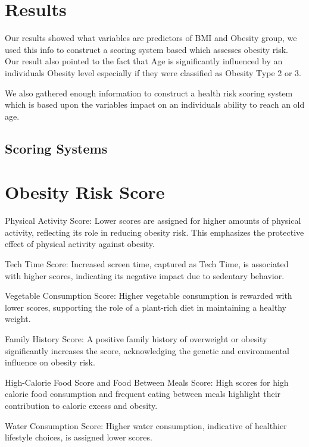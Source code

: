 \documentclass[
]{article}
\begin{document}
\hypertarget{results}{%
\section{Results}\label{results}}

Our results showed what variables are predictors of BMI and Obesity
group, we used this info to construct a scoring system based which
assesses obesity risk. Our result also pointed to the fact that Age is
significantly influenced by an individuals Obesity level especially if
they were classified as Obesity Type 2 or 3.

We also gathered enough information to construct a health risk scoring
system which is based upon the variables impact on an individuals
ability to reach an old age.

\hypertarget{scoring-systems}{%
\subsection{Scoring Systems}\label{scoring-systems}}

\hypertarget{obesity-risk-score}{%
\section{Obesity Risk Score}\label{obesity-risk-score}}

Physical Activity Score: Lower scores are assigned for higher amounts of
physical activity, reflecting its role in reducing obesity risk. This
emphasizes the protective effect of physical activity against obesity.

Tech Time Score: Increased screen time, captured as Tech Time, is
associated with higher scores, indicating its negative impact due to
sedentary behavior.

Vegetable Consumption Score: Higher vegetable consumption is rewarded
with lower scores, supporting the role of a plant-rich diet in
maintaining a healthy weight.

Family History Score: A positive family history of overweight or obesity
significantly increases the score, acknowledging the genetic and
environmental influence on obesity risk.

High-Calorie Food Score and Food Between Meals Score: High scores for
high calorie food consumption and frequent eating between meals
highlight their contribution to caloric excess and obesity.

Water Consumption Score: Higher water consumption, indicative of
healthier lifestyle choices, is assigned lower scores.
\end{document}
